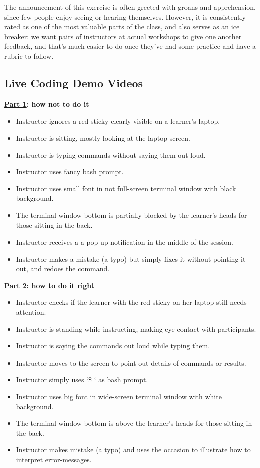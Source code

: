 The announcement of this exercise is often greeted with groans and
apprehension, since few people enjoy seeing or hearing themselves.
However, it is consistently rated as one of the most valuable parts of
the class, and also serves as an ice breaker: we want pairs of
instructors at actual workshops to give one another feedback, and that's
much easier to do once they've had some practice and have a rubric to
follow.

\subsection{Live Coding Demo Videos}\label{live-coding-demo-videos}

\textbf{\href{https://youtu.be/bXxBeNkKmJE}{Part 1}: how not to do it}

\begin{itemize}
\itemsep1pt\parskip0pt
\item
  Instructor ignores a red sticky clearly visible on a learner's laptop.
\item
  Instructor is sitting, mostly looking at the laptop screen.
\item
  Instructor is typing commands without saying them out loud.
\item
  Instructor uses fancy bash prompt.
\item
  Instructor uses small font in not full-screen terminal window with
  black background.
\item
  The terminal window bottom is partially blocked by the learner's heads
  for those sitting in the back.
\item
  Instructor receives a a pop-up notification in the middle of the
  session.
\item
  Instructor makes a mistake (a typo) but simply fixes it without
  pointing it out, and redoes the command.
\end{itemize}

\textbf{\href{https://youtu.be/SkPmwe\_WjeY}{Part 2}: how to do it right}

\begin{itemize}
\itemsep1pt\parskip0pt
\item
  Instructor checks if the learner with the red sticky on her laptop
  still needs attention.
\item
  Instructor is standing while instructing, making eye-contact with
  participants.
\item
  Instructor is saying the commands out loud while typing them.
\item
  Instructor moves to the screen to point out details of commands or
  results.
\item
  Instructor simply uses `\$ ` as bash prompt.
\item
  Instructor uses big font in wide-screen terminal window with white
  background.
\item
  The terminal window bottom is above the learner's heads for those
  sitting in the back.
\item
  Instructor makes mistake (a typo) and uses the occasion to illustrate
  how to interpret error-messages.
\end{itemize}

